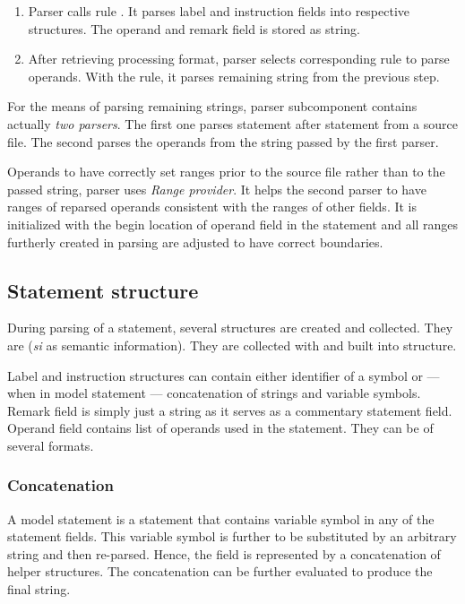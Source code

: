 \begin{enumerate}
	\item Parser calls rule . It parses label and instruction fields into respective structures. The operand and remark field is stored as string.
	\item After retrieving processing format, parser selects corresponding rule to parse operands. With the rule, it parses remaining string from the previous step.
\end{enumerate}

For the means of parsing remaining strings, parser subcomponent contains actually \emph{two parsers}. The first one parses statement after statement from a source file. The second parses the operands from the string passed by the first parser. 

Operands to have correctly set ranges prior to the source file rather than to the passed string, parser uses \emph{Range provider}. It helps the second parser to have ranges of reparsed operands consistent with the ranges of other fields. It is initialized with the begin location of operand field in the statement and all ranges furtherly created in parsing are adjusted to have correct boundaries.

\subsection{Statement structure}

During parsing of a statement, several structures are created and collected. They are  (\emph{si} as semantic information). They are collected with  and built into  structure.

Label and instruction structures can contain either identifier of a symbol or --- when in model statement --- concatenation of strings and variable symbols. Remark field is simply just a string as it serves as a commentary statement field. Operand field contains list of operands used in the statement. They can be of several formats.

\subsubsection{Concatenation}

A model statement is a statement that contains variable symbol in any of the statement fields. This variable symbol is further to be substituted by an arbitrary string and then re-parsed. Hence, the field is represented by a concatenation of helper structures. The concatenation can be further evaluated to produce the final string.

